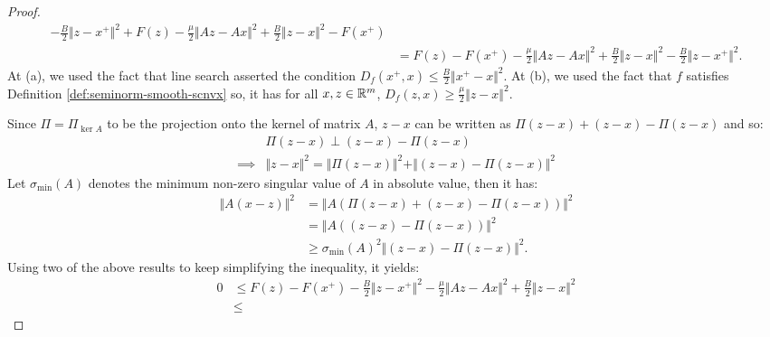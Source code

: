 \documentclass[12pt]{article}
\begin{document}
\begin{proof}
\begin{align*}
                    - \frac{B}{2}\Vert z - x^+\Vert^2 
                    + F(z) - \frac{\mu}{2}\Vert Az - Ax\Vert^2 
                    + \frac{B}{2}\Vert z - x\Vert^2
                    - F(x^+)
                    \\
                    &= 
                    F(z) - F(x^+) 
                    - \frac{\mu}{2}\Vert Az - Ax\Vert^2 
                    + \frac{B}{2}\Vert z - x\Vert^2
                    - \frac{B}{2}\Vert z - x^+\Vert^2. 
                \end{align*}
                At (a), we used the fact that line search asserted the condition $D_f(x^+, x) \le \frac{B}{2}\Vert x^+ - x\Vert^2$. 
                At (b), we used the fact that $f$ satisfies Definition \ref{def:seminorm-smooth-scnvx} so, it has for all $x, z \in \mathbb R^m$, $D_f(z, x) \ge \frac{\mu}{2}\Vert z - x\Vert^2$. 
                \par
                Since $\Pi = \Pi_{\ker A}$ to be the projection onto the kernel of matrix $A$, $z - x$ can be written as $\Pi(z - x) + (z - x) - \Pi(z - x)$ and so: 
                \begin{align*}
                    & \Pi(z - x) \perp (z - x) - \Pi(z - x)
                    \\
                    \implies & 
                    \Vert z - x\Vert^2 = \Vert \Pi(z - x) \Vert^2 + \Vert (z - x) - \Pi(z - x)\Vert^2
                \end{align*}
                Let $\sigma_{\min}(A)$ denotes the minimum non-zero singular value of $A$ in absolute value, then it has: 
                \begin{align*}
                    \Vert A(x - z)\Vert^2 &= \Vert A( \Pi(z - x)  + (z - x) - \Pi(z - x))\Vert^2
                    \\
                    &= \Vert A((z - x) - \Pi(z - x))\Vert^2
                    \\
                    &\ge \sigma_{\min}(A)^2\Vert (z - x) - \Pi(z - x)\Vert^2.
                \end{align*}
                Using two of the above results to keep simplifying the inequality, it yields: 
                \begin{align*}
                    0 &\le
                    F(z) - F(x^+)
                    - \frac{B}{2}\Vert z - x^+\Vert^2 
                    - \frac{\mu}{2}\Vert Az - Ax\Vert^2 
                    + \frac{B}{2}\Vert z - x\Vert^2
                    \\
                    &\le 

\end{align*}
\end{proof}
\end{document}
